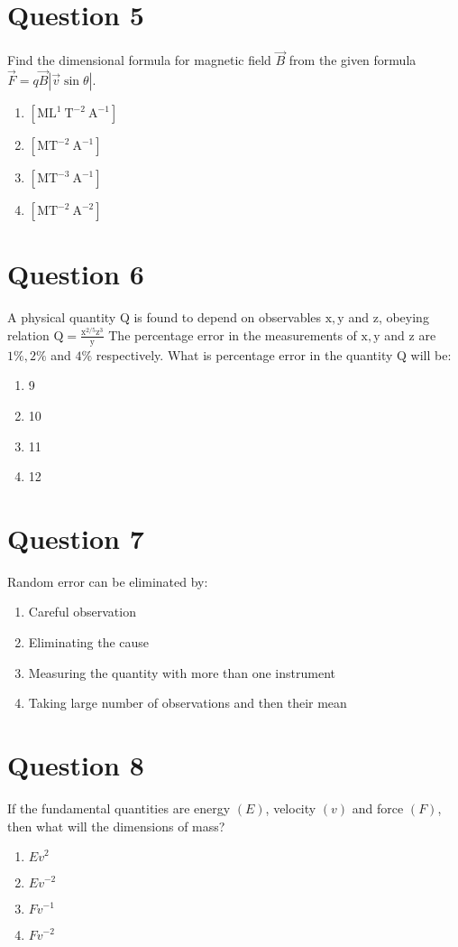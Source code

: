\documentclass{article}
\begin{document}
\section*{Question 5}
Find the dimensional formula for magnetic field \(\vec{B}\) from the given formula \(\vec{F}=q \vec{B}|\vec{v} \sin \theta|\).
\begin{enumerate}[label=(\alph*)]
\item \(\left[\mathrm{M} \mathrm{L}^{1} \mathrm{~T}^{-2} \mathrm{~A}^{-1}\right]\)
\item \(\left[\mathrm{M} \mathrm{T}^{-2} \mathrm{~A}^{-1}\right]\)
\item \(\left[\mathrm{M} \mathrm{T}^{-3} \mathrm{~A}^{-1}\right]\)
\item \(\left[\mathrm{M} \mathrm{T}^{-2} \mathrm{~A}^{-2}\right]\)
\end{enumerate}
\newpage
\section*{Question 6}
A physical quantity Q is found to depend on observables \(\mathrm{x}, \mathrm{y}\) and \(\mathrm{z}\), obeying relation \(\mathrm{Q}=\frac{\mathrm{x}^{2 / 5} \mathrm{z}^{3}}{\mathrm{y}}\) The percentage error in the measurements of \(\mathrm{x}, \mathrm{y}\) and \(\mathrm{z}\) are \(1 \%, 2 \%\) and \(4 \%\) respectively. What is percentage error in the quantity Q will be:
\begin{enumerate}[label=(\alph*)]
\item 9 %
\item 10 %
\item 11 %
\item 12 %
\end{enumerate}
\newpage
\section*{Question 7}
Random error can be eliminated by:
\begin{enumerate}[label=(\alph*)]
\item Careful observation
\item Eliminating the cause
\item Measuring the quantity with more than one instrument
\item Taking large number of observations and then their mean
\end{enumerate}
\newpage
\section*{Question 8}
If the fundamental quantities are energy \((E)\), velocity \((v)\) and force \((F)\), then what will the dimensions of mass?
\begin{enumerate}[label=(\alph*)]
\item \({Ev}^{2}\)
\item \({Ev}^{-2}\)
\item \({Fv}^{-1}\)
\item \({Fv}^{-2}\)
\end{enumerate}
\newpage
\end{document}
